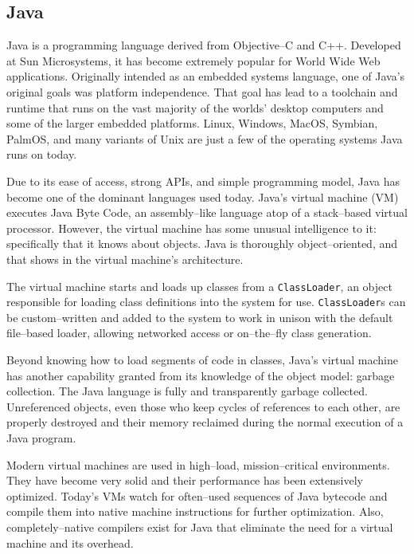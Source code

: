 \subsection{Java}
  Java\cite{java} is a programming language derived from Objective--C and C++.  Developed at Sun Microsystems, it has become extremely popular for World Wide Web applications.  Originally intended as an embedded systems language, one of Java's original goals was platform independence.  That goal has lead to a toolchain and runtime that runs on the vast majority of the worlds' desktop computers and some of the larger embedded platforms.  Linux, Windows, MacOS, Symbian, PalmOS, and many variants of Unix are just a few of the operating systems Java runs on today.  

  Due to its ease of access, strong APIs, and simple programming model, Java has become one of the dominant languages used today.  Java's virtual machine (VM) executes Java Byte Code, an assembly--like language atop of a stack--based virtual processor.  However, the virtual machine has some unusual intelligence to it: specifically that it knows about objects.  Java is thoroughly object--oriented, and that shows in the virtual machine's architecture.

  The virtual machine starts and loads up classes from a \texttt{ClassLoader}, an object responsible for loading class definitions into the system for use.  \texttt{ClassLoader}s can be custom--written and added to the system to work in unison with the default file--based loader, allowing networked access or on--the--fly class generation\cite{javassist}.

  Beyond knowing how to load segments of code in classes, Java's virtual machine has another capability granted from its knowledge of the object model: garbage collection.  The Java language is fully and transparently garbage collected.  Unreferenced objects, even those who keep cycles of references to each other, are properly destroyed and their memory reclaimed during the normal execution of a Java program.

  Modern virtual machines are used in high--load, mission--critical environments.  They have become very solid and their performance has been extensively optimized.  Today's VMs watch for often--used sequences of Java bytecode and compile them into native machine instructions for further optimization.  Also, completely--native compilers exist for Java\cite{GCJ} that eliminate the need for a virtual machine and its overhead.

